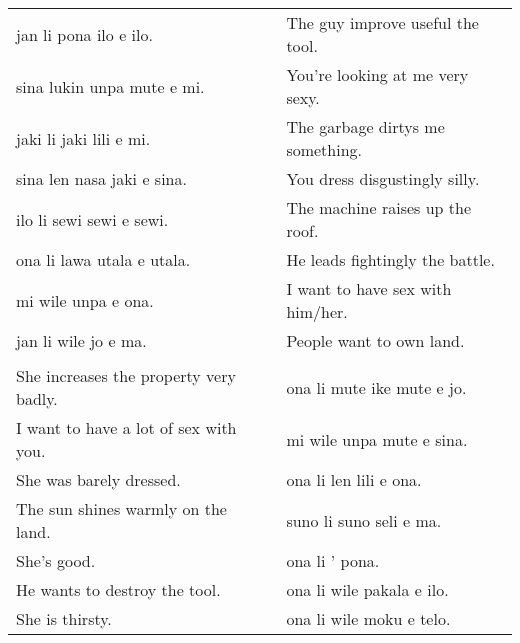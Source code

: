 \begin{supertabular}{p{5,5cm}|ll}
jan li pona ilo e ilo. && The guy improve useful the tool. \\ %
sina lukin unpa mute e mi. && You're looking at me very sexy.   \\ %
jaki li jaki lili e mi. && The garbage dirtys me something. \\ %
sina len nasa jaki e sina. && You dress disgustingly silly. \\ %
ilo li sewi sewi e sewi. && The machine raises up the roof. \\ %
ona li lawa utala e utala. && He leads fightingly the battle. \\ %
mi wile unpa e ona. && I want to have sex with him/her.  \\
jan li wile jo e ma. && People want to own land. \\
 && \\ %
She increases the property very badly. && ona li mute ike mute e jo. \\
I want to have a lot of sex with you. && mi wile unpa mute e sina. \\
She was barely dressed. && ona li len lili e ona. \\
The sun shines warmly on the land. && suno li suno seli e ma. \\
She's good. && ona li ' pona. \\
He wants to destroy the tool. && ona li wile pakala e ilo. \\ %
She is thirsty. && ona li wile moku e telo. \\ %
\end{supertabular} 

